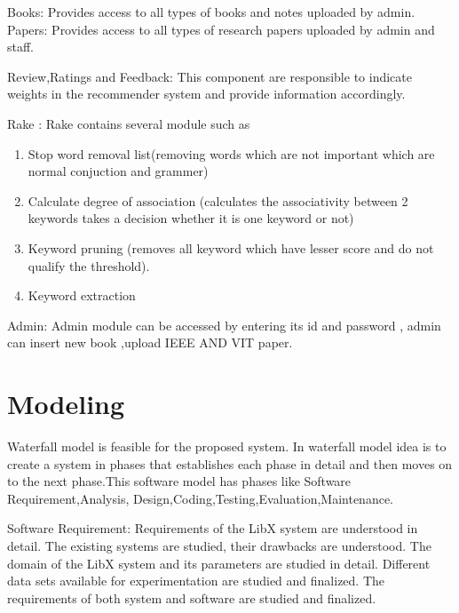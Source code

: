 \documentclass[a4paper,12pt]{report}
\begin{document}
\par Books: Provides access to all types of books and notes uploaded by
admin. Papers: Provides access to all types of research papers uploaded
by admin and staff.\\

\par Review,Ratings and Feedback: This component are responsible to indicate weights in the recommender system and provide information accordingly.\\

\par Rake : Rake contains several module such as
 \begin{enumerate}
   \item Stop word removal list(removing words which are not important which are normal conjuction and grammer)
   \item Calculate degree of association (calculates the associativity between 2 keywords takes a decision whether it is one keyword or not)
   \item Keyword pruning (removes all keyword which have lesser score and do not qualify the threshold).
   \item Keyword extraction
 \end{enumerate}

\par Admin: Admin module can be accessed by entering its id and password ,
admin can insert new book ,upload IEEE AND VIT paper.\\

\section{Modeling}
\par Waterfall model is feasible for the proposed system. In waterfall model
idea is to create a system in phases that establishes each phase in detail
and then moves on to the next phase.This software model has phases like
Software Requirement,Analysis,
Design,Coding,Testing,Evaluation,Maintenance.\\

\par Software Requirement: Requirements of the LibX system are understood
in detail. The existing systems are studied, their drawbacks are
understood. The domain of the LibX system and its parameters are
studied in detail. Different data sets available for experimentation are
studied and finalized. The requirements of both system and software are
studied and finalized.\\
\end{document}
